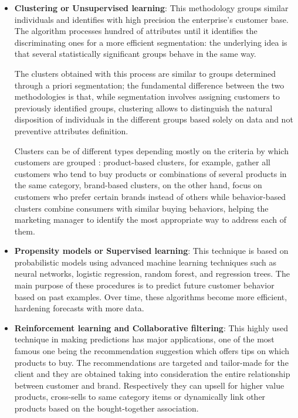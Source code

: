 \begin{itemize}
    \item \textbf{Clustering or Unsupervised learning}:  This methodology groups similar individuals and identifies with high precision the enterprise's customer base. The algorithm processes hundred of attributes until it identifies the discriminating ones for a more efficient segmentation: the underlying idea is that several statistically significant groups behave in the same way. 

    The clusters obtained with this process are similar to groups determined through a priori segmentation; the fundamental difference between the two methodologies is that, while segmentation involves assigning customers to previously identified groups, clustering allows to distinguish the natural disposition of individuals in the different groups based solely on data and not preventive attributes definition. 

    Clusters can be of different types depending mostly on the criteria by which customers are grouped : product-based clusters, for example, gather all customers who tend to buy products or combinations of several products in the same category, brand-based clusters, on the other hand, focus on customers who prefer certain brands instead of others while behavior-based clusters combine consumers with similar buying behaviors, helping the marketing manager to identify the most appropriate way to address each of them.

    \item \textbf{Propensity models or Supervised learning}: This technique is based on probabilistic models using advanced machine learning techniques such as neural networks, logistic regression, random forest, and regression trees. The main purpose of these procedures is to predict future customer behavior based on past examples. Over time, these algorithms become more efficient, hardening forecasts with more data.

    \item \textbf{Reinforcement learning and Collaborative filtering}: This highly used technique in making predictions has major applications, one of the most famous one being the recommendation suggestion which offers tips on which products to buy. The recommendations are targeted and tailor-made for the client and they are obtained taking into consideration the entire relationship between customer and brand. Respectively they can upsell for higher value products, cross-sells to same category items or dynamically link other products based on the bought-together association.
  \end{itemize} 


 



